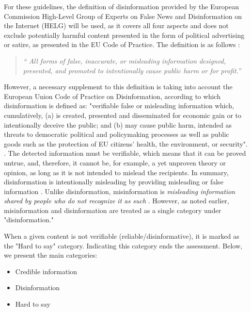 \documentclass[11pt]{article}
\begin{document}
For these guidelines, the definition of disinformation provided by the European Commission High-Level Group of Experts on False News and Disinformation on the Internet (HELG) will be used, as it covers all four aspects and does not exclude potentially harmful content presented in the form of political advertising or satire, as presented in the EU Code of Practice. The definition is as follows \cite{de2018multi}: 
\begin{quote}
    \itshape %
    `` All forms of false, inaccurate, or misleading information designed, presented, and promoted to intentionally cause public harm or for profit.''
    \hfill  %
\end{quote}

However, a necessary supplement to this definition is taking into account the European Union Code of Practice on Disinformation, according to which disinformation is defined as: "verifiable false or misleading information which, cumulatively, (a) is created, presented and disseminated for economic gain or to intentionally deceive the public; and (b) may cause public harm, intended as threats to democratic political and policymaking processes as well as public goods such as the protection of EU citizens' health, the environment, or security". \cite{eu2022strengthdiscode}. The detected information must be verifiable, which means that it can be proved untrue, and, therefore, it cannot be, for example, a yet unproven theory or opinion, as long as it is not intended to mislead the recipients. In summary, disinformation is intentionally misleading by providing misleading or false information \cite{eu2020communication}. Unlike disinformation, misinformation is \textit{misleading information shared by people who do not recognize it as such} \cite{de2018multi}. However, as noted earlier, misinformation and disinformation are treated as a single category under "disinformation."

When a given content is not verifiable (reliable/disinformative), it is marked as the "Hard to say" category. Indicating this category ends the assessment. 
Below, we present the main categories:

\begin{itemize}[nosep, leftmargin=*]
    \item Credible information
    \item Disinformation 
    \item Hard to say
\end{itemize}
\end{document}
